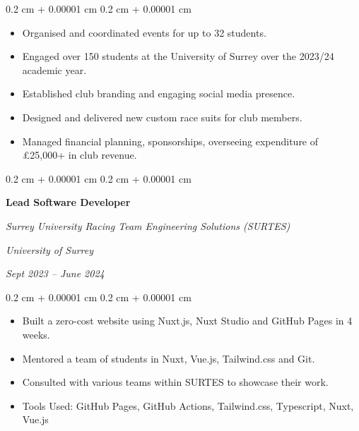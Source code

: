 \documentclass[10pt, letterpaper]{article}
\newenvironment{highlights}{
    \begin{itemize}[
        topsep=0.10 cm,
        parsep=0.10 cm,
        partopsep=0pt,
        itemsep=0pt,
        leftmargin=0.4 cm + 10pt
    ]
}{
    \end{itemize}
} %
\newenvironment{onecolentry}{
    \begin{adjustwidth}{
        0.2 cm + 0.00001 cm
    }{
        0.2 cm + 0.00001 cm
    }
}{
    \end{adjustwidth}
} %
\newenvironment{twocolentry}[2][]{
    \onecolentry
    \def\secondColumn{#2}
    \setcolumnwidth{\fill, 8 cm}
    \begin{paracol}{2}
}{
    \switchcolumn \raggedleft \secondColumn
    \end{paracol}
    \endonecolentry
} %
\begin{document}
        \vspace{0.10 cm}
        \begin{onecolentry}
            \begin{highlights}
                \item Organised and coordinated events for up to 32 students.
                \item Engaged over 150 students at the University of Surrey over the 2023/24 academic year.
                \item Established club branding and engaging social media presence.
                \item Designed and delivered new custom race suits for club members.
                \item Managed financial planning, sponsorships, overseeing expenditure of £25,000+ in club revenue.
            \end{highlights}
        \end{onecolentry}


        \vspace{0.2 cm}

        \begin{twocolentry}{
        \textit{University of Surrey}    
            
        \textit{Sept 2023 – June 2024}}
            \textbf{Lead Software Developer}
            
            \textit{Surrey University Racing Team Engineering Solutions (SURTES)}
        \end{twocolentry}

        \vspace{0.10 cm}
        \begin{onecolentry}
            \begin{highlights}
                \item Built a zero-cost website using Nuxt.js, Nuxt Studio and GitHub Pages in 4 weeks.
                \item Mentored a team of students in Nuxt, Vue.js, Tailwind.css and Git.
                \item Consulted with various teams within SURTES to showcase their work.
                \item Tools Used: GitHub Pages, GitHub Actions, Tailwind.css, Typescript, Nuxt, Vue.js
            \end{highlights}
        \end{onecolentry}
\end{document}
